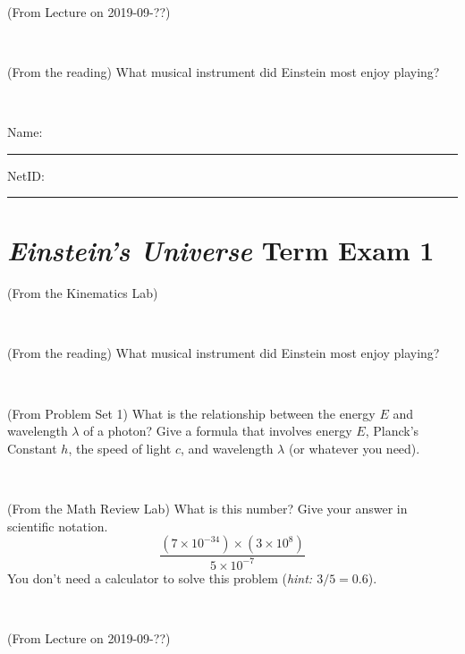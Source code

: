 \documentclass[12pt, letterpaper]{article}
\begin{document}
\vfill ~

\begin{problem} (From Lecture on 2019-09-??)
\end{problem}


\vfill ~

\begin{problem} (From the reading)
What musical instrument did Einstein most enjoy playing?
\end{problem}


\vfill ~


\cleardoublepage



\noindent
Name: \rule[-1ex]{0.60\textwidth}{0.1pt}
NetID: \rule[-1ex]{0.20\textwidth}{0.1pt}

\section*{\textsl{Einstein's Universe} Term Exam 1}
\setcounter{problem}{1}


\begin{problem} (From the Kinematics Lab)

\end{problem}


\vfill ~

\begin{problem} (From the reading)
What musical instrument did Einstein most enjoy playing?
\end{problem}


\vfill ~

\begin{problem} (From Problem Set 1)
What is the relationship between the energy $E$ and wavelength
$\lambda$ of a photon? Give a formula that involves energy $E$,
Planck's Constant $h$, the speed of light $c$, and wavelength
$\lambda$ (or whatever you need).
\end{problem}

\vfill ~

\begin{problem} (From the Math Review Lab)
What is this number? Give your answer in scientific notation.
$$
\frac{(7\times10^{-34})\times(3\times10^8)}{5\times10^{-7}}
$$
You don't need a calculator to solve this problem (\textit{hint: $3/5=0.6$}).
\end{problem}


\vfill ~


\clearpage


\begin{problem} (From Lecture on 2019-09-??)
\end{problem}
\end{document}
